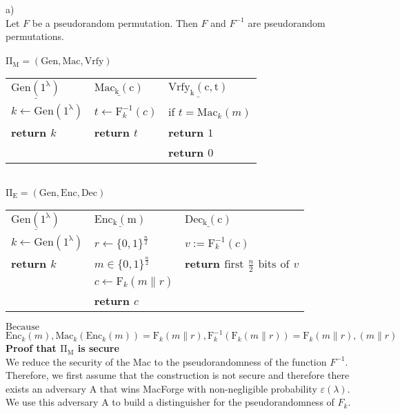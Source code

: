 \pagebreak
a)\\
Let $F$ be a pseudorandom permutation. Then $F$ and $F^{-1}$ are pseudorandom permutations.\\
\\
$\mathrm{\Pi_{M} = (Gen, Mac, Vrfy)}$\\
\vskip 0.05in
\begin{tabular}{l@{\hskip 1in}l@{\hskip 0.5in}l}
$\underline{\mathrm{Gen(1^{\lambda })}}$ & $\underline{\mathrm{Mac_{k}(c)}}$ & $\underline{\mathrm{Vrfy_{k}(c,t)}}$ \\
$k \leftarrow \mathrm{Gen(1^{\lambda})}$ & $t \leftarrow \mathrm{F}_{k}^{-1}(c)$ & if $t = \mathrm{Mac}_{k}(m)$\\
\bf{return} $k$ & \bf{return} $t$ & \indent\bf{return} $1$\\
 & & \bf{return} $0$\\
\end{tabular}\\
\vskip 1cm
\noindent$\mathrm{\Pi_{E} = (Gen, Enc, Dec)}$\\
\vskip 0.05in
\begin{tabular}{l@{\hskip 1in}l@{\hskip 0.5in}l}
$\underline{\mathrm{Gen(1^{\lambda })}}$ & $\underline{\mathrm{Enc_{k}(m)}}$ & $\underline{\mathrm{Dec_{k}(c)}}$ \\
$k \leftarrow \mathrm{Gen(1^{\lambda})}$ & $r \leftarrow \{0,1\}^{\frac{n}{2}}$ & $v := \mathrm{F}_{k}^{-1}(c)$\\
\bf{return} $k$ & $m \in  \{0,1\}^{\frac{n}{2}}$ & \bf{return} $\mathrm{first}$ $\frac{n}{2}$ $\mathrm{bits}$ $\mathrm{of}$  $v$  \\
 & $c \leftarrow \mathrm{F}_{k}(m \parallel r)$ &  \\
 & \bf{return} $c$ & \\
\end{tabular}
\vskip 1cm
\noindent $\mathrm{Because}$ $\mathrm{Enc}_{k}(m), \mathrm{Mac}_{k}(\mathrm{Enc}_{k}(m)) = \mathrm{F}_{k}(m\parallel r), \mathrm{F}_{k}^{-1}(\mathrm{F}_{k}(m\parallel r)) = \mathrm{F}_{k}(m\parallel r), (m\parallel r)$\\
\vskip 1cm
\noindent \textbf{Proof that $\mathrm{\Pi_{M}}$ is secure}\\
We reduce the security of the Mac to the pseudorandomness of the function $F^{-1}$.\\
Therefore, we first assume that the construction is not secure and therefore there exists an adversary A that wins MacForge with non-negligible probability $\varepsilon(\lambda )$. We use this adversary A to build a distinguisher for the pseudorandomness of $F_{k}$.\\
